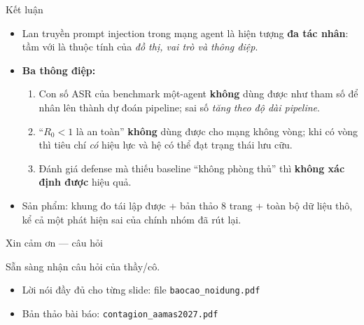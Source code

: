 \documentclass[aspectratio=169,11pt]{beamer}
\begin{document}
\begin{frame}{Kết luận}
  \begin{itemize}
    \item Lan truyền prompt injection trong mạng agent là hiện tượng \textbf{đa tác nhân}:
          tầm với là thuộc tính của \emph{đồ thị, vai trò và thông điệp}.
    \item \textbf{Ba thông điệp:}
      \begin{enumerate}
        \item Con số ASR của benchmark một-agent \textbf{không} dùng được như tham số để
              nhân lên thành dự đoán pipeline; sai số \emph{tăng theo độ dài pipeline}.
        \item ``$R_0<1$ là an toàn'' \textbf{không} dùng được cho mạng không vòng; khi có
              vòng thì tiêu chí \emph{có} hiệu lực và hệ có thể đạt trạng thái lưu cữu.
        \item Đánh giá defense mà thiếu baseline ``không phòng thủ'' thì
              \textbf{không xác định được} hiệu quả.
      \end{enumerate}
    \item Sản phẩm: khung đo tái lập được + bản thảo 8 trang + toàn bộ dữ liệu thô,
          kể cả một phát hiện sai của chính nhóm đã rút lại.
  \end{itemize}
\end{frame}

\begin{frame}{Xin cảm ơn --- câu hỏi}
  \begin{center}
    \Large Sẵn sàng nhận câu hỏi của thầy/cô.
  \end{center}
  \vspace{0.6cm}
  \begin{itemize}
    \item Lời nói đầy đủ cho từng slide: file \texttt{baocao\_noidung.pdf}
    \item Bản thảo bài báo: \texttt{contagion\_aamas2027.pdf}
  \end{itemize}
\end{frame}
\end{document}
